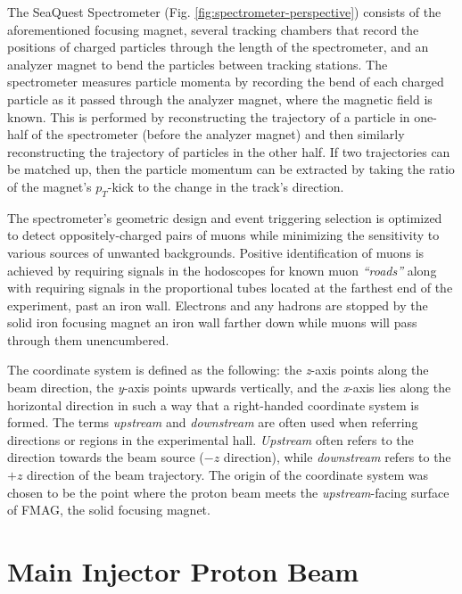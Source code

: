 The SeaQuest Spectrometer (Fig. \ref{fig:spectrometer-perspective}) consists of the aforementioned focusing magnet, several tracking chambers that record the positions of charged particles through the length of the spectrometer, and an analyzer magnet to bend the particles between tracking stations. The spectrometer measures particle momenta by recording the bend of each charged particle as it passed through the analyzer magnet, where the magnetic field is known. This is performed by reconstructing the trajectory of a particle in one-half of the spectrometer (before the analyzer magnet) and then similarly reconstructing the trajectory of particles in the other half. If two trajectories can be matched up, then the particle momentum can be extracted by taking the ratio of the magnet's $p_T$-kick to the change in the track's direction.

The spectrometer's geometric design and event triggering selection is optimized to detect oppositely-charged pairs of muons while minimizing the sensitivity to various sources of unwanted backgrounds. Positive identification of muons is achieved by requiring signals in the hodoscopes for known muon \emph{``roads''} along with requiring signals in the proportional tubes located at the farthest end of the experiment, past an iron wall. Electrons and any hadrons are stopped by the solid iron focusing magnet an iron wall farther down while muons will pass through them unencumbered.

The coordinate system is defined as the following: the \emph{z}-axis points along the beam direction, the \emph{y}-axis points upwards vertically, and the \emph{x}-axis lies along the horizontal direction in such a way that a right-handed coordinate system is formed. The terms \emph{upstream} and \emph{downstream} are often used when referring directions or regions in the experimental hall. \emph{Upstream} often refers to the direction towards the beam source ($-z$ direction), while \emph{downstream} refers to the $+z$ direction of the beam trajectory. The origin of the coordinate system was chosen to be the point where the proton beam meets the \emph{upstream}-facing surface of FMAG, the solid focusing magnet.

\section{Main Injector Proton Beam}


